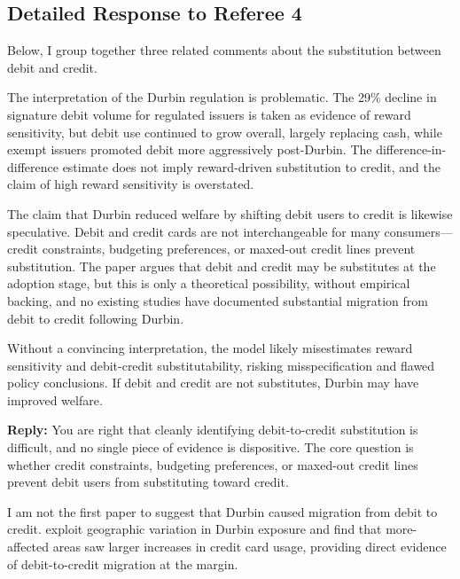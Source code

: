 \documentclass[main.tex]{subfiles}
\begin{document}
\begin{refsection}


\section*{Detailed Response to Referee 4}

Below, I group together three related comments about the substitution between debit and credit.

\begin{refcommentnoclear}
The interpretation of the Durbin regulation is problematic.
The 29\% decline in signature debit volume for regulated issuers is taken as evidence of reward sensitivity, but debit use continued to grow overall, largely replacing cash, while exempt issuers promoted debit more aggressively post-Durbin.
The difference-in-difference estimate does not imply reward-driven substitution to credit, and the claim of high reward sensitivity is overstated.

The claim that Durbin reduced welfare by shifting debit users to credit is likewise speculative.
Debit and credit cards are not interchangeable for many consumers---credit constraints, budgeting preferences, or maxed-out credit lines prevent substitution.
The paper argues that debit and credit may be substitutes at the adoption stage, but this is only a theoretical possibility, without empirical backing, and no existing studies have documented substantial migration from debit to credit following Durbin.

Without a convincing interpretation, the model likely misestimates reward sensitivity and debit-credit substitutability, risking misspecification and flawed policy conclusions.
If debit and credit are not substitutes, Durbin may have improved welfare.
\end{refcommentnoclear}

\textbf{Reply:} You are right that cleanly identifying debit-to-credit substitution is difficult, and no single piece of evidence is dispositive.
The core question is whether credit constraints, budgeting preferences, or maxed-out credit lines prevent debit users from substituting toward credit.

I am not the first paper to suggest that Durbin caused migration from debit to credit. \textcite{Mukharlyamov.Sarin2025} exploit geographic variation in Durbin exposure and find that more-affected areas saw larger increases in credit card usage, providing direct evidence of debit-to-credit migration at the margin.


\end{refsection}
\end{document}
